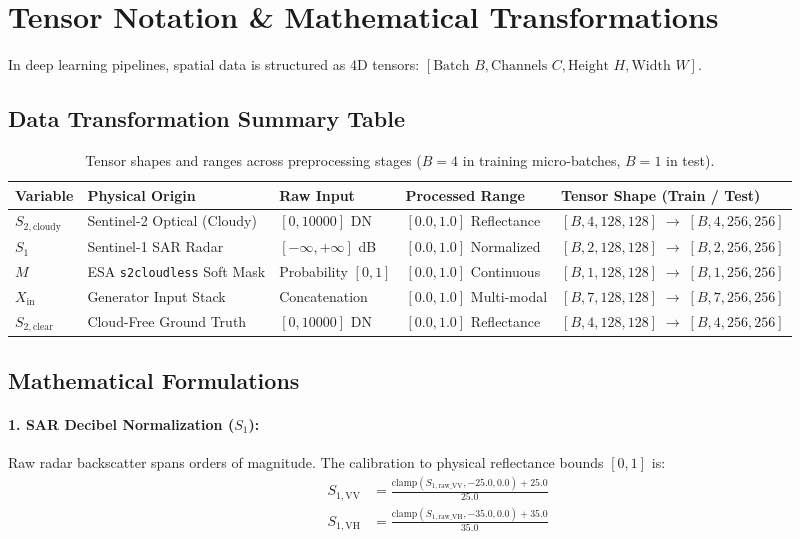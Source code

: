 \documentclass[11pt,a4paper]{article}
\begin{document}
\newpage

\section{Tensor Notation \& Mathematical Transformations}

In deep learning pipelines, spatial data is structured as 4D tensors: $[\text{Batch } B, \text{Channels } C, \text{Height } H, \text{Width } W]$.

\subsection{Data Transformation Summary Table}

\begin{table}[h!]
\centering
\small
\renewcommand{\arraystretch}{1.3}
\begin{tabular}{lllll}
\toprule
\textbf{Variable} & \textbf{Physical Origin} & \textbf{Raw Input} & \textbf{Processed Range} & \textbf{Tensor Shape (Train / Test)} \\
\midrule
$S_{2,\text{cloudy}}$ & Sentinel-2 Optical (Cloudy) & $[0, 10000]$ DN & $[0.0, 1.0]$ Reflectance & $[B, 4, 128, 128] \;\to\; [B, 4, 256, 256]$ \\
$S_1$ & Sentinel-1 SAR Radar & $[-\infty, +\infty]$ dB & $[0.0, 1.0]$ Normalized & $[B, 2, 128, 128] \;\to\; [B, 2, 256, 256]$ \\
$M$ & ESA \texttt{s2cloudless} Soft Mask & Probability $[0, 1]$ & $[0.0, 1.0]$ Continuous & $[B, 1, 128, 128] \;\to\; [B, 1, 256, 256]$ \\
$X_{\text{in}}$ & Generator Input Stack & Concatenation & $[0.0, 1.0]$ Multi-modal & $[B, 7, 128, 128] \;\to\; [B, 7, 256, 256]$ \\
$S_{2,\text{clear}}$ & Cloud-Free Ground Truth & $[0, 10000]$ DN & $[0.0, 1.0]$ Reflectance & $[B, 4, 128, 128] \;\to\; [B, 4, 256, 256]$ \\
\bottomrule
\end{tabular}
\caption{Tensor shapes and ranges across preprocessing stages ($B=4$ in training micro-batches, $B=1$ in test).}
\end{table}

\subsection{Mathematical Formulations}

\paragraph{1. SAR Decibel Normalization ($S_1$):}
Raw radar backscatter spans orders of magnitude. The calibration to physical reflectance bounds $[0, 1]$ is:
\begin{align}
S_{1,\text{VV}} &= \frac{\text{clamp}(S_{1,\text{raw\_VV}}, -25.0, 0.0) + 25.0}{25.0} \\
S_{1,\text{VH}} &= \frac{\text{clamp}(S_{1,\text{raw\_VH}}, -35.0, 0.0) + 35.0}{35.0}
\end{align}
\end{document}

